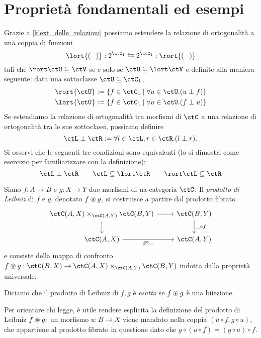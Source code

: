 \section[Proprietà ed esempi]{Proprietà fondamentali ed esempi}
\begin{remark} 
  Grazie a \ref{klext_delle_relazioni} possiamo estendere la relazione di ortogonalità a una coppia di funzioni 
  \[\lort{(-)} : 2^{\ctC_1} \leftrightarrows 2^{\ctC_1} : \rort{(-)}\]
  tali che $\rort\ctU\subseteq\ctV$ se e solo se $\ctU\subseteq\lort\ctV$ e definite alla maniera seguente: data una sottoclasse $\ctU\subseteq \ctC_1$, 
  \begin{gather*}
    \rort{\ctU} := \{f\in\ctC_1\mid \forall u\in\ctU.(u\perp f)\}\\ 
    \lort{\ctU} := \{f\in\ctC_1\mid \forall u\in\ctU.(f\perp u)\}
  \end{gather*}
  Se estendiamo la relazione di ortogonalità tra morfismi di $\ctC$ a una relazione di ortogonalità tra le sue sottoclassi, possiamo definire 
  \[\ctL\perp \ctR := \forall l\in\ctL,r\in\ctR.(l\perp r).\]
  Si osservi che le seguenti tre condizioni sono equivalenti (lo si dimostri come esercizio per familiarizzare con la definizione): 
  \[\ctL\perp\ctR\qquad \ctL\subseteq\lort\ctR\qquad \rort\ctL\subseteq \ctR\]
\end{remark}
\begin{definition}
  Siano $f : A \to B$ e $g : X\to Y$ due morfismi di ua categoria $\ctC$. Il \emph{prodotto di Leibniz} di $f$ e $g$, denotato $f\oast g$, si costruisce a partire dal prodotto fibrato
  \[
    \begin{tikzcd}
      \pull {\ctC(A,X)}{\ctC(B,Y)}{\ctC(A,Y)} \ar[r]\ar[d] & \ctC(B,Y) \ar[d, "\_\circ f"]\\ 
      \ctC(A,X) \ar[r, "g\circ\_"'] & \ctC(A,Y)
    \end{tikzcd}
  \]
  e consiste della mappa di confronto $f\oast g : \ctC(B,X) \to \pull {\ctC(A,X)}{\ctC(B,Y)}{\ctC(A,Y)}$ indotta dalla proprietà universale. 

  Diciamo che il prodotto di Leibniz di $f,g$ è \emph{esatto} se $f\oast g$ è una biiezione.
\end{definition}
Per orientare chi legge, è utile rendere esplicita la definizione del prodotto di Leibniz $f\oast g$: un morfismo $u : B\to X$ viene mandato nella coppia $(u\circ f, g\circ u)$, che appartiene al prodotto fibrato in questione dato che $g\circ (u\circ f) = (g\circ u)\circ f$.


